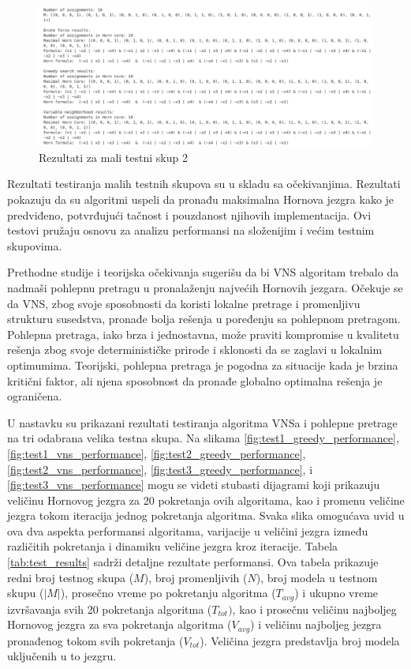 \documentclass[12pt,oneside]{memoir}
\begin{document}
\begin{figure}[H]
    \centering
    \includegraphics[width=1\linewidth]{small_test_2.png}
    \caption{Rezultati za mali testni skup 2}
    \label{fig:slika2}
\end{figure}

Rezultati testiranja malih testnih skupova su u skladu sa očekivanjima. Rezultati pokazuju da su algoritmi uspeli da pronađu maksimalna Hornova jezgra kako je predviđeno, potvrđujući tačnost i pouzdanost njihovih implementacija. Ovi testovi pružaju osnovu za analizu performansi na složenijim i većim testnim skupovima.

Prethodne studije i teorijska očekivanja sugerišu da bi VNS algoritam trebalo da nadmaši pohlepnu pretragu u pronalaženju najvećih Hornovih jezgara. Očekuje se da VNS, zbog svoje sposobnosti da koristi lokalne pretrage i promenljivu strukturu susedstva, pronađe bolja rešenja u poređenju sa pohlepnom pretragom. Pohlepna pretraga, iako brza i jednostavna, može praviti kompromise u kvalitetu rešenja zbog svoje determinističke prirode i sklonosti da se zaglavi u lokalnim optimumima. Teorijski, pohlepna pretraga je pogodna za situacije kada je brzina kritični faktor, ali njena sposobnost da pronađe globalno optimalna rešenja je ograničena.

U nastavku su prikazani rezultati testiranja algoritma VNSa i pohlepne pretrage na tri odabrana velika testna skupa. Na slikama \ref{fig:test1_greedy_performance}, \ref{fig:test1_vns_performance}, \ref{fig:test2_greedy_performance}, \ref{fig:test2_vns_performance}, \ref{fig:test3_greedy_performance}, i \ref{fig:test3_vns_performance} mogu se videti stubasti dijagrami koji prikazuju veličinu Hornovog jezgra za 20 pokretanja ovih algoritama, kao i promenu veličine jezgra tokom iteracija jednog pokretanja algoritma. Svaka slika omogućava uvid u ova dva aspekta performansi algoritama, varijacije u veličini jezgra između različitih pokretanja i dinamiku veličine jezgra kroz iteracije. Tabela \ref{tab:test_results} sadrži detaljne rezultate performansi. Ova tabela prikazuje redni broj testnog skupa ($M$), broj promenljivih ($N$), broj modela u testnom skupu ($|M|$), prosečno vreme po pokretanju algoritma ($T_{avg}$) i ukupno vreme izvršavanja svih 20 pokretanja algoritma ($T_{tot})$, kao i prosečnu veličinu najboljeg Hornovog jezgra za sva pokretanja algoritma ($V_{avg}$) i veličinu najboljeg jezgra pronađenog tokom svih pokretanja ($V_{tot}$). Veličina jezgra predstavlja broj modela uključenih u to jezgru.
\newpage
\end{document}
